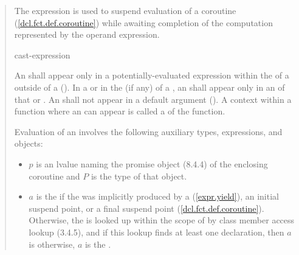\begin{quote}
\pnum
The  expression is used to suspend evaluation of a 
coroutine (\ref{dcl.fct.def.coroutine}) while awaiting completion of the computation represented by the operand expression.

\begin{bnf}
  \br
   cast-expression
\end{bnf}

\pnum
An  shall appear only in a potentially-evaluated expression within the  of a  
 outside of a  (). In a  or in the  (if any) of a , an  shall appear only in an  of that  or .
An  shall not appear in a default argument (). A context within a function where an  can appear is called a  of the function.

\pnum
Evaluation of an  involves the following auxiliary types, expressions, and objects:

\begin{itemize}
	
  
  \item $p$ is an lvalue naming the promise object (8.4.4) of the enclosing coroutine and $P$ is the type of that object.
  
  \item $a$ is the  if 
  the  was implicitly produced by a  (\ref{expr.yield}), an initial suspend point, or a final suspend point (\ref{dcl.fct.def.coroutine}). 
  Otherwise, the   is looked up within the scope of  by class member access lookup (3.4.5), and if this lookup finds at least one declaration, then $a$ is \linebreak\mbox{} otherwise, $a$ is the  .
  

\end{itemize}
\end{quote}
